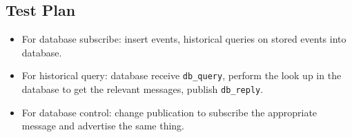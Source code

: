 \documentclass[11pt]{article}
\begin{document}
\subsection{Test Plan}    %
\begin{itemize}
\item For database subscribe: insert events, historical queries on stored events into database.
\item For historical query: database receive \verb+db_query+, perform the look up in the database to get the relevant messages, publish \verb+db_reply+.
\item For database control: change publication to subscribe the appropriate message and advertise the same thing.
\end{itemize} 
\end{document}
